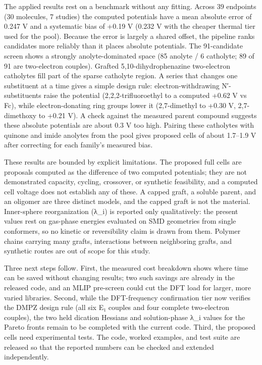 \documentclass[journal=jcisd8,manuscript=article]{achemso}
\begin{document}
The applied results rest on a benchmark without any fitting. Across 39 endpoints (30 molecules, 7 studies) the computed potentials have a mean absolute error of 0.247 V and a systematic bias of +0.19 V (0.232 V with the cheaper thermal tier used for the pool). Because the error is largely a shared offset, the pipeline ranks candidates more reliably than it places absolute potentials. The 91-candidate screen shows a strongly anolyte-dominated space (85 anolyte / 6 catholyte; 89 of 91 are two-electron couples). Grafted 5,10-dihydrophenazine two-electron catholytes fill part of the sparse catholyte region. A series that changes one substituent at a time gives a simple design rule: electron-withdrawing N′-substituents raise the potential (2,2,2-trifluoroethyl to a computed +0.62 V vs Fc), while electron-donating ring groups lower it (2,7-dimethyl to +0.30 V, 2,7-dimethoxy to +0.21 V). A check against the measured parent compound suggests these absolute potentials are about 0.3 V too high. Pairing these catholytes with quinone and imide anolytes from the pool gives proposed cells of about 1.7–1.9 V after correcting for each family's measured bias.

These results are bounded by explicit limitations. The proposed full cells are proposals computed as the difference of two computed potentials; they are not demonstrated capacity, cycling, crossover, or synthetic feasibility, and a computed cell voltage does not establish any of these. A capped graft, a soluble parent, and an oligomer are three distinct models, and the capped graft is not the material. Inner-sphere reorganization (λ\_i) is reported only qualitatively: the present values rest on gas-phase energies evaluated on SMD geometries from single conformers, so no kinetic or reversibility claim is drawn from them. Polymer chains carrying many grafts, interactions between neighboring grafts, and synthetic routes are out of scope for this study.

Three next steps follow. First, the measured cost breakdown shows where time can be saved without changing results; two such savings are already in the released code, and an MLIP pre-screen could cut the DFT load for larger, more varied libraries. Second, while the DFT-frequency confirmation tier now verifies the DMPZ design rule (all six E₁ couples and four complete two-electron couples), the two held dication Hessians and solution-phase λ\_i values for the Pareto fronts remain to be completed with the current code. Third, the proposed cells need experimental tests. The code, worked examples, and test suite are released so that the reported numbers can be checked and extended independently.
\end{document}
